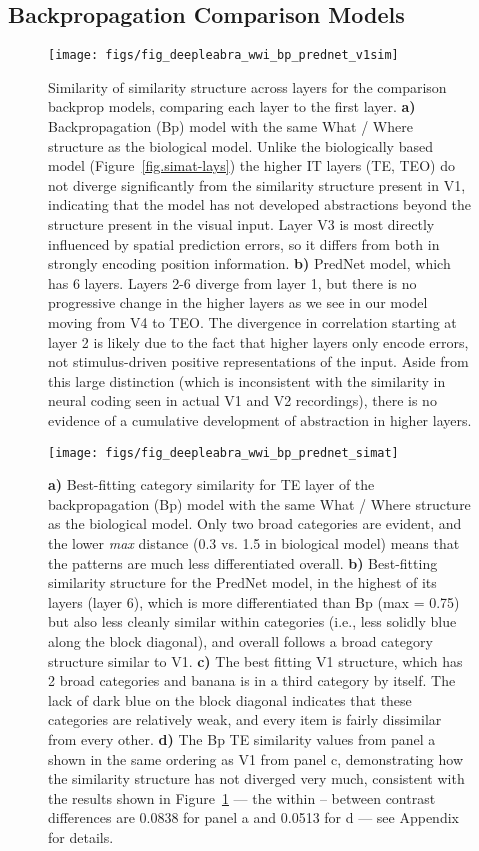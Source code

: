 \documentclass[11pt,twoside]{article}
\newif\myifpdf
\begin{document}
\subsection{Backpropagation Comparison Models}

\begin{figure}
  \centering\texttt{[image: figs/fig\_deepleabra\_wwi\_bp\_prednet\_v1sim]}
  \caption{\footnotesize Similarity of similarity structure across layers for the comparison backprop models, comparing each layer to the first layer.  {\bf a)} Backpropagation (Bp) model with the same What / Where structure as the biological model.  Unlike the biologically based model (Figure~\ref{fig.simat-lays}) the higher IT layers (TE, TEO) do not diverge significantly from the similarity structure present in V1, indicating that the model has not developed abstractions beyond the structure present in the visual input.  Layer V3 is most directly influenced by spatial prediction errors, so it differs from both in strongly encoding position information.  {\bf b)} PredNet model, which has 6 layers.  Layers 2-6 diverge from layer 1, but there is no progressive change in the higher layers as we see in our model moving from V4 to TEO. The divergence in correlation starting at layer 2 is likely due to the fact that higher layers only encode errors, not stimulus-driven positive representations of the input.  Aside from this large distinction (which is inconsistent with the similarity in neural coding seen in actual V1 and V2 recordings), there is no evidence of a cumulative development of abstraction in higher layers.}
  \label{fig.bpred-v1sim}
\end{figure}

\begin{figure}
  \centering\texttt{[image: figs/fig\_deepleabra\_wwi\_bp\_prednet\_simat]}
  \caption{\footnotesize {\bf a)} Best-fitting category similarity for TE layer of the backpropagation (Bp) model with the same What / Where structure as the biological model.  Only two broad categories are evident, and the lower \emph{max} distance (0.3 vs. 1.5 in biological model) means that the patterns are much less differentiated overall.  {\bf b)} Best-fitting similarity structure for the PredNet model, in the highest of its layers (layer 6), which is more differentiated than Bp (max = 0.75) but also less cleanly similar within categories (i.e., less solidly blue along the block diagonal), and overall follows a broad category structure similar to V1. {\bf c)} The best fitting V1 structure, which has 2 broad categories and banana is in a third category by itself.  The lack of dark blue on the block diagonal indicates that these categories are relatively weak, and every item is fairly dissimilar from every other.  {\bf d)} The Bp TE similarity values from panel a shown in the same ordering as V1 from panel c, demonstrating how the similarity structure has not diverged very much, consistent with the results shown in Figure~\ref{fig.bpred-v1sim} --- the within -- between contrast differences are 0.0838 for panel a and 0.0513 for d --- see Appendix for details.}
  \label{fig.bpred}
\end{figure}
\end{document}
